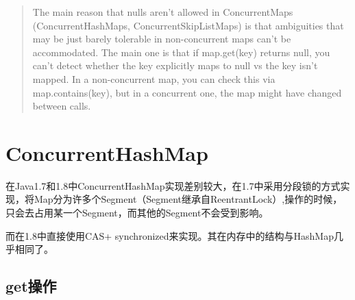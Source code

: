 \documentclass[12pt]{article}
\begin{document}
\begin{quote}
The main reason that nulls aren't allowed in ConcurrentMaps (ConcurrentHashMaps, ConcurrentSkipListMaps) is that ambiguities that may be just barely tolerable in non-concurrent maps can't be accommodated. The main one is that if map.get(key) returns null, you can't detect whether the key explicitly maps to null vs the key isn't mapped. In a non-concurrent map, you can check this via map.contains(key), but in a concurrent one, the map might have changed between calls.
\end{quote}

\section{ConcurrentHashMap}\label{concurrenthashmap}

在Java1.7和1.8中ConcurrentHashMap实现差别较大，在1.7中采用分段锁的方式实现，将Map分为许多个Segment（Segment继承自ReentrantLock）,操作的时候，只会去占用某一个Segment，而其他的Segment不会受到影响。

而在1.8中直接使用CAS+ synchronized来实现。其在内存中的结构与HashMap几乎相同了。

\subsection{get操作}\label{getux64cdux4f5c}
\end{document}
